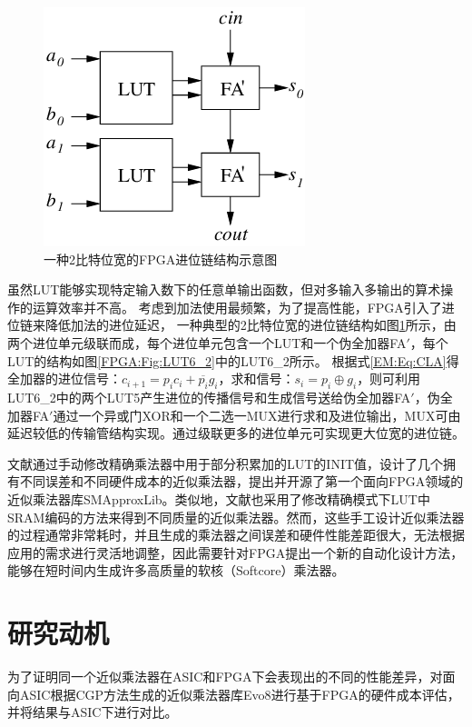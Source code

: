\begin{figure}[!h]
    \centering
    \includegraphics[width=0.4\linewidth]{figs/FPGA-carry_chain.png}
    \caption{一种2比特位宽的FPGA进位链结构示意图}
    \label{FPGA:Fig:carry_chain}
\end{figure}

虽然LUT能够实现特定输入数下的任意单输出函数，但对多输入多输出的算术操作的运算效率并不高。
考虑到加法使用最频繁，为了提高性能，FPGA引入了进位链来降低加法的进位延迟，
一种典型的2比特位宽的进位链结构如图\ref{FPGA:Fig:carry_chain}所示，由两个进位单元级联而成，每个进位单元包含一个LUT和一个伪全加器FA$'$，每个LUT的结构如图\ref{FPGA:Fig:LUT6_2}中的LUT6\_2所示。
根据式\eqref{EM:Eq:CLA}得全加器的进位信号：$c_{i+1} = p_i c_i  + \overline{p_i} g_i$，求和信号：$s_{i} = p_i \oplus g_i$，则可利用LUT6\_2中的两个LUT5产生进位的传播信号和生成信号送给伪全加器FA$'$，伪全加器FA$'$通过一个异或门XOR和一个二选一MUX进行求和及进位输出，MUX可由延迟较低的传输管结构实现。通过级联更多的进位单元可实现更大位宽的进位链。



文献\cite{AC:AM:FPGA:SMApproxLib}通过手动修改精确乘法器中用于部分积累加的LUT的INIT值，设计了几个拥有不同误差和不同硬件成本的近似乘法器，提出并开源了第一个面向FPGA领域的近似乘法器库SMApproxLib。类似地，文献\cite{AC:AM:FPGA:CaCc,AC:AM:FPGA:FPT22,AC:AM:FPGA:TCAD22}也采用了修改精确模式下LUT中SRAM编码的方法来得到不同质量的近似乘法器。然而，这些手工设计近似乘法器的过程通常非常耗时，并且生成的乘法器之间误差和硬件性能差距很大，无法根据应用的需求进行灵活地调整，因此需要针对FPGA提出一个新的自动化设计方法，能够在短时间内生成许多高质量的软核（Softcore）乘法器。

\section{研究动机}

为了证明同一个近似乘法器在ASIC和FPGA下会表现出的不同的性能差异，对面向ASIC根据CGP方法生成的近似乘法器库Evo8\cite{AC:AM:CGP_Evoapprox8b}进行基于FPGA的硬件成本评估，并将结果与ASIC下进行对比。


